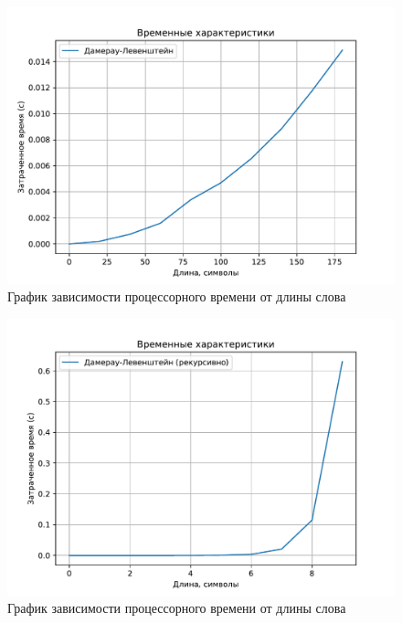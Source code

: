 \begin{figure}[H]
	\centering
	\includegraphics{assets/plots/cpu-dam-lev.pdf}
	\caption{График зависимости процессорного времени от длины слова}
	\label{plt:cpu-dam-lev}
\end{figure}

\begin{figure}[H]
	\centering
	\includegraphics{assets/plots/cpu-rec.pdf}
	\caption{График зависимости процессорного времени от длины слова}
	\label{plt:cpu-rec}
\end{figure}

